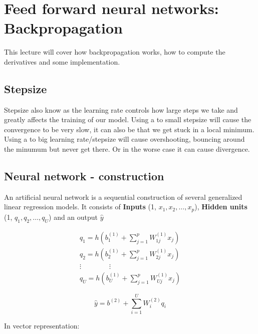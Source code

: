 
\section{Feed forward neural networks: Backpropagation}
This lecture will cover how backpropagation works, how to compute the derivatives and some implementation. 

\subsection*{Stepsize}
Stepsize also know as the learning rate controls how large steps we take and greatly affects the training of our model. Using a to small stepsize will cause the convergence to be very slow, it can also be that we get stuck in a local minimum. Using a to big learning rate/stepsize will cause overshooting, bouncing around the minumum but never get there. Or in the worse case it can cause divergence. 



\subsection*{Neural network - construction}
An artificial neural network is a sequential construction of several generalized linear regression models. It consists of \textbf{Inputs} (1, $x_1, x_2, \ldots, x_p$), \textbf{Hidden units} (1, $q_1,q_2,\ldots, q_U$) and an output $\hat{y}$

	\begin{equation}
	\begin{aligned}
		q_1 = h(b^{(1)}_1 + \sum_{j=1}^{p}W^{(1)}_{1j}x_j) \\
		q_2 = h(b^{(1)}_2 + \sum_{j=1}^{p}W^{(1)}_{2j}x_j) \\
		\vdots \quad \quad \quad \quad \vdots \\
		q_U = h(b^{(1)}_U + \sum_{j=1}^{p}W^{(1)}_{Uj}x_j)
	\end{aligned}
	\end{equation}

	\begin{equation}
		\hat{y} = b^{(2)} + \sum_{i=1}^{U}W^{(2)}_iq_i
	\end{equation}


In vector representation:

